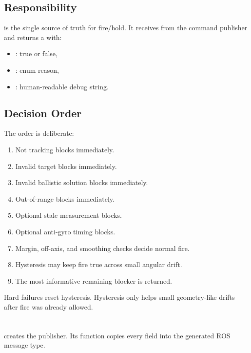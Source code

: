 \subsection{Responsibility}

 is the single source of truth for fire/hold. It receives
 from the command publisher and returns a
 with:

\begin{itemize}
  \item {}: true or false,
  \item {}: enum reason,
  \item {}: human-readable debug string.
\end{itemize}

\subsection{Decision Order}

The order is deliberate:

\begin{enumerate}
  \item Not tracking blocks immediately.
  \item Invalid target blocks immediately.
  \item Invalid ballistic solution blocks immediately.
  \item Out-of-range blocks immediately.
  \item Optional stale measurement blocks.
  \item Optional anti-gyro timing blocks.
  \item Margin, off-axis, and smoothing checks decide normal fire.
  \item Hysteresis may keep fire true across small angular drift.
  \item The most informative remaining blocker is returned.
\end{enumerate}

Hard failures reset hysteresis. Hysteresis only helps small geometry-like
drifts after fire was already allowed.

\section{}

 creates the  publisher. Its
 function copies every  field into the generated
ROS message type.

